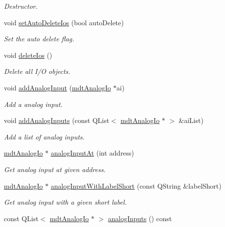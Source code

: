 \begin{DoxyCompactItemize}
\begin{DoxyCompactList}\small\item\em Destructor. \end{DoxyCompactList}\item 
void \hyperlink{classmdt_device_ios_af771f8080ce4a7260baa0acccacae0e1}{setAutoDeleteIos} (bool autoDelete)
\begin{DoxyCompactList}\small\item\em Set the auto delete flag. \end{DoxyCompactList}\item 
void \hyperlink{classmdt_device_ios_a272fc1fa86e1b66e6af0e58b130939e0}{deleteIos} ()
\begin{DoxyCompactList}\small\item\em Delete all I/O objects. \end{DoxyCompactList}\item 
void \hyperlink{classmdt_device_ios_a0e2683630eff9410003a36ae5af76b52}{addAnalogInput} (\hyperlink{classmdt_analog_io}{mdtAnalogIo} $\ast$ai)
\begin{DoxyCompactList}\small\item\em Add a analog input. \end{DoxyCompactList}\item 
void \hyperlink{classmdt_device_ios_a776dc0508f88f8ea206801fc7472bfb2}{addAnalogInputs} (const QList$<$ \hyperlink{classmdt_analog_io}{mdtAnalogIo} $\ast$ $>$ \&aiList)
\begin{DoxyCompactList}\small\item\em Add a list of analog inputs. \end{DoxyCompactList}\item 
\hyperlink{classmdt_analog_io}{mdtAnalogIo} $\ast$ \hyperlink{classmdt_device_ios_a70a3d979ec5d44297e8195e37596d5bc}{analogInputAt} (int address)
\begin{DoxyCompactList}\small\item\em Get analog input at given address. \end{DoxyCompactList}\item 
\hyperlink{classmdt_analog_io}{mdtAnalogIo} $\ast$ \hyperlink{classmdt_device_ios_ae31753e23d7ab14073f852dca85c2f9e}{analogInputWithLabelShort} (const QString \&labelShort)
\begin{DoxyCompactList}\small\item\em Get analog input with a given short label. \end{DoxyCompactList}\item 
const QList$<$ \hyperlink{classmdt_analog_io}{mdtAnalogIo} $\ast$ $>$ \hyperlink{classmdt_device_ios_aab70f76d2107f0a9324a9b9d4db21532}{analogInputs} () const 

\end{DoxyCompactItemize}
